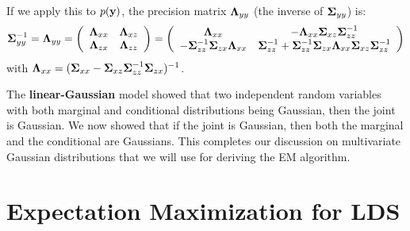 \vspace{3mm}

 If we apply this to $p(\bs{y})$, the precision matrix $\bs{\Lambda}_{yy}$ (the inverse of $\bs{\Sigma}_{yy}$) is:
\begin{equation}
 \bs{\Sigma}_{yy}^{-1} = \bs{\Lambda}_{yy} =  \myarray{cc}{\bs{\Lambda}_{xx} & \bs{\Lambda}_{xz} \\ \bs{\Lambda}_{zx} & \bs{\Lambda}_{zz}} = \myarray{cc}{\bs{\Lambda}_{xx} & 
-\bs{\Lambda}_{xx}\bs{\Sigma}_{xz}\bs{\Sigma}_{zz}^{-1} \\ -\bs{\Sigma}_{zz}^{-1}\bs{\Sigma}_{zx}\bs{\Lambda}_{xx} & \bs{\Sigma}_{zz}^{-1} + 
\bs{\Sigma}_{zz}^{-1}\bs{\Sigma}_{zx}\bs{\Lambda}_{xx}\bs{\Sigma}_{xz}\bs{\Sigma}_{zz}^{-1}}\label{eq:block-inversion-covariance}
\end{equation}
with $\bs{\Lambda}_{xx} = (\bs{\Sigma}_{xx} - \bs{\Sigma}_{xz}\bs{\Sigma}_{zz}^{-1}\bs{\Sigma}_{zx})^{-1}$.\vspace{3mm}

\vspace{3mm}
 

The \textbf{linear-Gaussian} model showed that two independent random variables with both marginal and conditional distributions being Gaussian, then the joint is Gaussian. We now showed that if the joint is Gaussian, then both the marginal and the conditional are Gaussians. This completes our discussion on multivariate Gaussian distributions that we will use for deriving the EM algorithm.

\section{Expectation Maximization for LDS}

